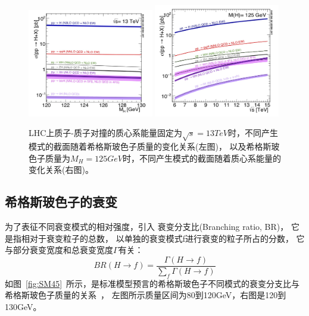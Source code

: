 \begin{figure}  
  \begin{center}
    \includegraphics[width=0.49\textwidth]{figuresTHE/SM2.jpg}
    \includegraphics[width=0.49\textwidth]{figuresTHE/SM3.jpg}
  \end{center}
  \caption{
  LHC上质子-质子对撞的质心系能量固定为$\sqrt{s}=13TeV$时，不同产生模式的截面随着希格斯玻色子质量的变化关系(左图)，
以及希格斯玻色子质量为$M_H=125GeV$时，不同产生模式的截面随着质心系能量的变化关系(右图)。
    }
  \label{fig:SM23}
\end{figure}



\subsection{希格斯玻色子的衰变}
\label{sec:HiggsDC}

为了表征不同衰变模式的相对强度，引入
衰变分支比(Branching ratio, BR)，
它是指相对于衰变粒子的总数，
以单独的衰变模式f进行衰变的粒子所占的分数，
它与部分衰变宽度和总衰变宽度$\Gamma$有关：
\begin{equation} 
\label{eq:HiggsDC1}
BR(H \rightarrow f)= \frac{\Gamma(H \rightarrow f)}{\sum_f \Gamma(H \rightarrow f)}
\end{equation}
如图~\ref{fig:SM45}~所示，是标准模型预言的希格斯玻色子不同模式的衰变分支比与希格斯玻色子质量的关系~\cite{HANDHIGGS}，
左图所示质量区间为80到120GeV，右图是120到130GeV。

